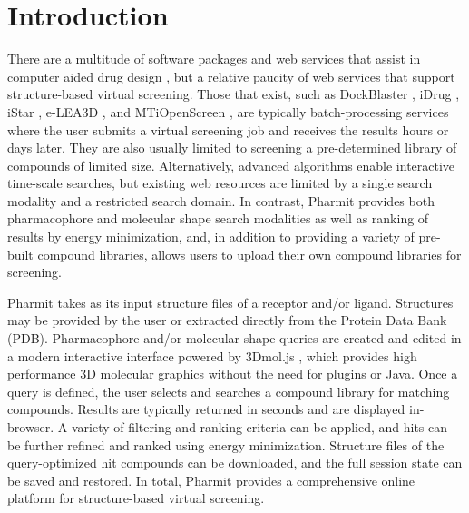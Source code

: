 \section{Introduction}

There are a multitude of software packages and web services that assist in computer aided drug design \cite{Villoutreix_2013}, but a relative paucity of web services that support structure-based virtual screening.  Those that exist, such as DockBlaster \cite{Irwin_2009}, iDrug \cite{Wang_2014}, iStar \cite{Li_2014}, e-LEA3D \cite{Douguet_2010}, and MTiOpenScreen \cite{Labb__2015}, are typically batch-processing services where the user submits a virtual screening job and receives the results hours or days later. They are also usually limited to screening a pre-determined library of compounds of limited size. Alternatively, advanced algorithms enable interactive time-scale searches, but existing web resources \cite{Koes_2012,Koes_2012z} are limited by a single search modality and a restricted search domain.  In contrast, Pharmit provides both pharmacophore and molecular shape search modalities as well as ranking of results by energy minimization, and, in addition to providing a variety of pre-built compound libraries, allows users to upload their own compound libraries for screening. 

Pharmit takes as its input structure files of a receptor and/or ligand. Structures may be provided by the user or extracted directly from the Protein Data Bank (PDB). 
Pharmacophore and/or molecular shape queries are created and edited in a modern interactive interface powered by 3Dmol.js \cite{Rego_2014}, which provides high performance 3D molecular graphics without the need for plugins or Java. Once a query is defined, the user selects and searches a compound library for matching compounds.  Results are typically returned in seconds and are displayed in-browser.  A variety of filtering and ranking criteria can be applied, and hits can be further refined and ranked using energy minimization. Structure files of the query-optimized hit compounds can be downloaded, and the full session state can be saved and restored.  In total, Pharmit provides a comprehensive online platform for structure-based virtual screening.





